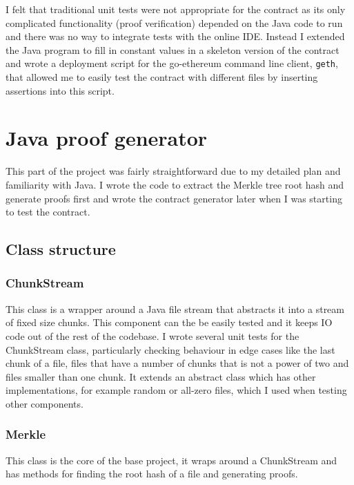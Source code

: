 \documentclass[12pt,a4paper,twoside,openright]{report}
\begin{document}
I felt that traditional unit tests were not appropriate for the contract as its only complicated functionality (proof verification)
depended on the Java code to run and there was no way to integrate tests with the online IDE.
Instead I extended the Java program to fill in constant values in a skeleton version of the contract and wrote a deployment script
for the go-ethereum command line client, \texttt{geth}, that allowed me to easily test the contract with different files
by inserting assertions into this script.

\section{Java proof generator}



This part of the project was fairly straightforward due to my detailed plan and familiarity with Java.
I wrote the code to extract the Merkle tree root hash and generate proofs first and wrote the contract generator later when I was starting to test the contract.

\subsection{Class structure}
\subsubsection{ChunkStream}

This class is a wrapper around a Java file stream that abstracts it into a stream of fixed size chunks.
This component can the be easily tested and it keeps IO code out of the rest of the codebase.
I wrote several unit tests for the ChunkStream class, particularly checking behaviour in edge cases like the last chunk of a file,
files that have a number of chunks that is not a power of two and files smaller than one chunk.
It extends an abstract class which has other implementations, for example random or all-zero files, which I used when testing other components.

\subsubsection{Merkle}
This class is the core of the base project, it wraps around a ChunkStream and has methods for finding the root hash of a file and generating proofs.
\end{document}
